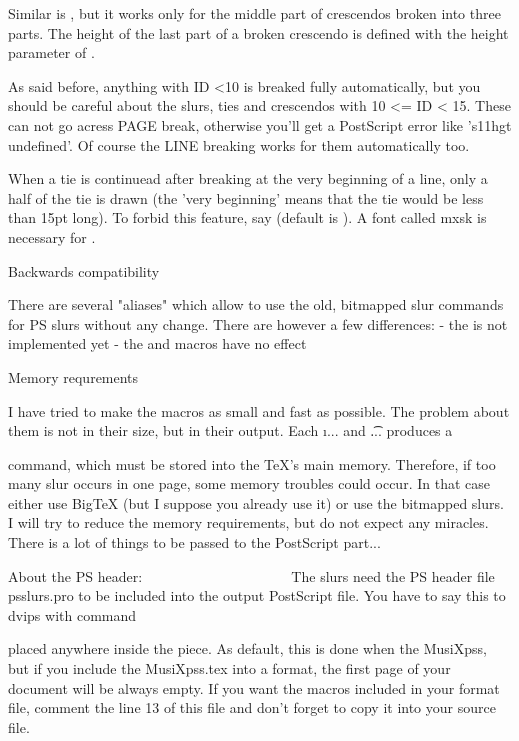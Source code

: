 Similar is \liftcresc, but it works only for the middle part of crescendos
broken into three parts. The height of the last part of a broken crescendo
is defined with the height parameter of \Tcresc.

As said before, anything with ID <10 is breaked fully automatically, but
you should be careful about the slurs, ties and crescendos with 10 <= ID < 15.
These can not go acress PAGE break, otherwise you'll get a PostScript error
like 's11hgt undefined'. Of course the LINE breaking works for them
automatically too.

When a tie is continuead after breaking at the very beginning of a line,
only a half of the tie is drawn (the 'very beginning' means that the tie
would be less than 15pt long). To forbid this feature, say \nohalfties
(default is \halfties). A font called mxsk is necessary for \halfties.


Backwards compatibility
~~~~~~~~~~~~~~~~~~~~~~~

There are several "aliases" which allow to use the old, bitmapped slur
commands for PS slurs without any change. There are however a few differences:
- the \invertslur is not implemented yet
- the \curve and \midslur macros have no effect




Memory requrements
~~~~~~~~~~~~~~~~~~

I have tried to make the macros as small and fast as possible. The problem
about them is not in their size, but in their output. Each \i... and \t...
produces a \special command, which must be stored into the TeX's main memory.
Therefore, if too many slur occurs in one page, some memory troubles could
occur. In that case either use BigTeX (but I suppose you already use it) or
use the bitmapped slurs. I will try to reduce the memory requirements, but
do not expect any miracles. There is a lot of things to be passed to the
PostScript part...



About the PS header:
~~~~~~~~~~~~~~~~~~~~
The slurs need the PS header file psslurs.pro to be included into the
output PostScript file. You have to say this to dvips with command


placed anywhere inside the piece. As default, this is done when 
the MusiXpss, but if you include the MusiXpss.tex into a format, the first
page of your document will be always empty. If you want the macros included
in your format file, comment the line 13 of this file and don't forget
to copy it into your source file.

